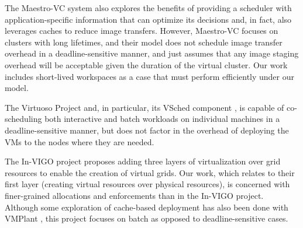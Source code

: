 The Maestro{}-VC system \cite{BorjaCite18} also explores the benefits of providing a
scheduler with application{}-specific information that can optimize its
decisions and, in fact, also leverages caches to reduce image
transfers. However, Maestro{}-VC focuses on clusters with long
lifetimes, and their model does not schedule image transfer overhead in
a deadline{}-sensitive manner, and just assumes that any image staging
overhead will be acceptable given the duration of the virtual cluster.
Our work includes short{}-lived workspaces as a case that must perform
efficiently under our model.

The Virtuoso Project \cite{BorjaCite19} and, in particular, its VSched component \cite{BorjaCite17},
is capable of co{}-scheduling both interactive and batch workloads on
individual machines in a deadline{}-sensitive manner, but does not
factor in the overhead of deploying the VMs to the nodes where they are
needed.

The In{}-VIGO project \cite{BorjaCite16} proposes adding three layers of
virtualization over grid resources to enable the creation of virtual
grids. Our work, which relates to their first layer (creating virtual
resources over physical resources), is concerned with finer{}-grained
allocations and enforcements than in the In{}-VIGO project. Although some exploration of cache-based deployment has also been done with VMPlant \cite{BorjaCite20}, this project focuses on batch as opposed to deadline-sensitive cases.


